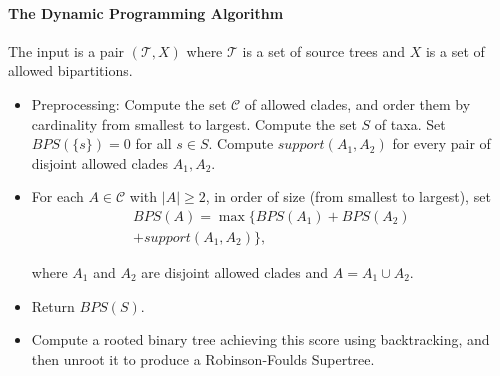 \paragraph{\bf The Dynamic Programming Algorithm}
The input is   a pair $(\mathcal{T},X)$ 
where  
$\mathcal{T}$ is a set of source trees
and $X$ is a set of allowed bipartitions. 
\begin{itemize}
\item Preprocessing: Compute the set $\mathcal{C}$ of allowed clades, and order
them by cardinality from smallest to largest.
Compute the set $S$ of taxa.
Set $BPS(\{s\})=0$ for all $s \in S$.
Compute $support(A_1,A_2)$ for every pair of disjoint
allowed clades $A_1,A_2$.
\item For each $A \in \mathcal{C}$ with $|A| \geq 2$, in order of size (from
smallest to largest), 
set
\begin{multline*}
BPS(A) = \max \{BPS(A_1)+BPS(A_2)\\+support(A_1,A_2)\},
\end{multline*}

\noindent
where $A_1$ and $A_2$ are disjoint allowed clades and 
$A = A_1 \cup A_2$.
\item Return $BPS(S)$.
\item Compute a rooted binary tree achieving this score
using backtracking, and then
unroot it
to produce a
Robinson-Foulds Supertree.
\end{itemize}

